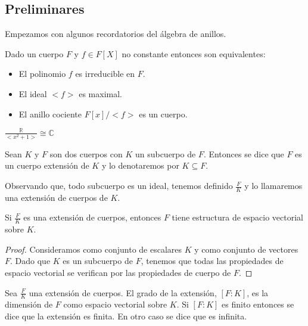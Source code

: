 \subsection{Preliminares}

Empezamos con algunos recordatorios del álgebra de anillos. 

\begin{theorem}\label{recordatorio-1}
Dado un cuerpo $F$ y $f \in F[X]$ no constante entonces son equivalentes:

\begin{itemize}
\item El polinomio $f$ es irreducible en $F$. 
\item El ideal $<f>$ es maximal. 
\item El anillo cociente $F[x]/<f>$ es un cuerpo. 
\end{itemize}
\end{theorem}

\begin{example}
$\frac{\mathbb{R}}{<x^2+1>} \cong \mathbb{C}$  
\end{example}

\begin{definition}
Sean $K$ y $F$ son dos cuerpos con $K$ un subcuerpo de $F$. Entonces se dice que $F$ es un cuerpo extensión de $K$ y lo denotaremos por $K \subseteq F$. 

Observando que, todo subcuerpo es un ideal, tenemos definido $\frac{F}{K}$ y lo llamaremos una extensión de cuerpos de $K$. 
\end{definition}

\begin{proposition}
Si $\frac{F}{K}$ es una extensión de cuerpos, entonces $F$ tiene estructura de espacio vectorial sobre $K$.
\end{proposition}
\begin{proof}
Consideramos como conjunto de escalares $K$ y como conjunto de vectores $F$. Dado que $K$ es un subcuerpo de $F$, tenemos que todas las propiedades de espacio vectorial se verifican por las propiedades de cuerpo de $F$. 
\end{proof}

\begin{definition}
Sea $\frac{F}{K}$ una extensión de cuerpos. El grado de la extensión, $[F:K]$, es la dimensión de $F$ como espacio vectorial sobre $K$. Si $[F:K]$ es finito entonces se dice que la extensión es finita. En otro caso se dice que es infinita. 
\end{definition}

